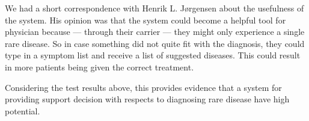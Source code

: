 We had a short correspondence with Henrik L. J\o rgensen about the
usefulness of the system. His opinion was that the system could become a
helpful tool for physician because --- through their carrier --- they might
only experience a single rare disease. So in case something did not
quite fit with the diagnosis, they could type in a symptom list and
receive a list of suggested diseases. This could result in more patients
being given the correct treatment.

Considering the test results above, this provides evidence that a
system for providing support decision with respects to diagnosing rare
disease have high potential.
